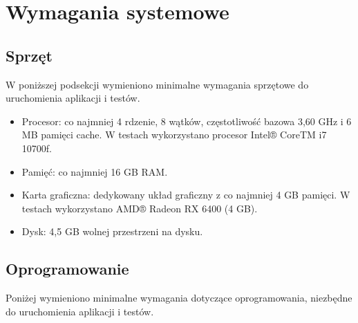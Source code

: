 \section{Wymagania systemowe}
\subsection{Sprzęt}
W poniższej podsekcji wymieniono minimalne wymagania sprzętowe do uruchomienia aplikacji i testów.

\begin{itemize}
	\item Procesor: co najmniej 4 rdzenie, 8 wątków, częstotliwość bazowa 3,60 GHz i 6 MB pamięci cache. W testach wykorzystano procesor Intel® CoreTM i7 10700f.
	\item Pamięć: co najmniej 16 GB RAM.
	\item Karta graficzna: dedykowany układ graficzny z co najmniej 4 GB pamięci. W testach wykorzystano AMD® Radeon RX 6400 (4 GB).
	\item Dysk: 4,5 GB wolnej przestrzeni na dysku.
\end{itemize}

\subsection{Oprogramowanie}

Poniżej wymieniono minimalne wymagania dotyczące oprogramowania, niezbędne do uruchomienia aplikacji i testów.

